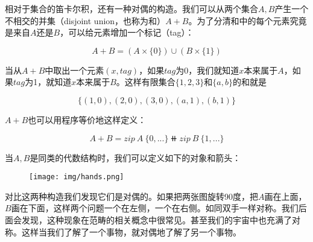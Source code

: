 \documentclass{article}
\begin{document}
\vspace{5mm}

相对于集合的笛卡尔积，还有一种对偶的构造。我们可以从两个集合$A, B$产生一个不相交的并集（disjoint union，也称为和）$A + B$。为了分清和中的每个元素究竟是来自$A$还是$B$，可以给元素增加一个标记（tag）：

\[
A + B = (A \times \{0\}) \cup (B \times \{1\})
\]

当从$A+B$中取出一个元素$(x, tag)$，如果$tag$为0，我们就知道$x$本来属于$A$，如果$tag$为1，就知道$x$本来属于$B$。这样有限集合$\{1, 2, 3\}$和$\{a, b\}$的和就是

\[
\{(1, 0), (2, 0), (3, 0), (a, 1), (b, 1)\}
\]

$A + B$也可以用程序等价地这样定义：

\begin{mdframed}
\[
A + B = zip\ A\ \{0, ...\} \doubleplus zip\ B\ \{1, ...\}
\]
\end{mdframed}


当$A, B$是同类的代数结构时，我们可以定义如下的对象和箭头：

\begin{center}
\end{center}

\begin{figure}[htbp]
 \centering
 \texttt{[image: img/hands.png]}
 \captionsetup{labelformat=empty}
 \caption{}
 \label{fig:hands}
\end{figure}

对比这两种构造我们发现它们是对偶的。如果把两张图旋转90度，把$A$画在上面，$B$画在下面，这样两个问题一个在左侧，一个在右侧。如同双手一样对称。我们后面会发现，这种现象在范畴的相关概念中很常见。甚至我们的宇宙中也充满了对称。这样当我们了解了一个事物，就对偶地了解了另一个事物。
\end{document}
